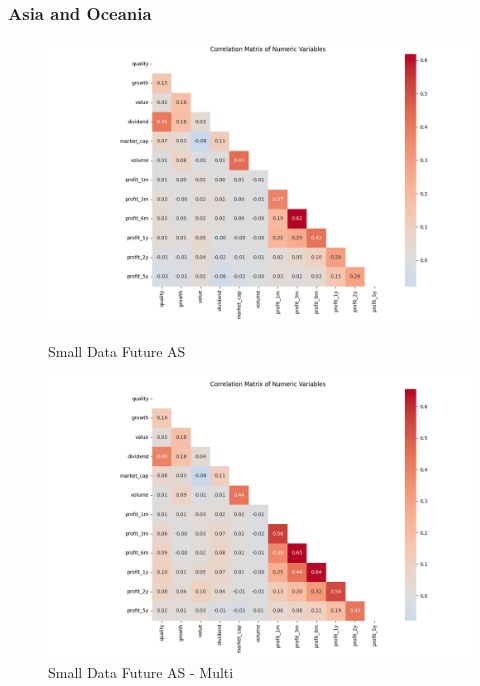 \documentclass[11pt,english,a4paper,hidelinks]{book}
\begin{document}
\subsubsection{Asia and Oceania}
\begin{figure}[H]
    \centering
    \begin{minipage}{0.48\textwidth}
        \centering
        \includegraphics[width=\linewidth]{images/code/descriptive analysis/correlations/Small Data future AS.png}
        \caption{Small Data Future AS}
        \label{fig:small_data_future_as_correlations}
    \end{minipage}
    \begin{minipage}{0.48\textwidth}
        \centering
        \includegraphics[width=\linewidth]{images/code/descriptive analysis/correlations/Small Data future AS - Multi.png}
        \caption{Small Data Future AS - Multi}
        \label{fig:small_data_future_as_multi_correlations}
    \end{minipage}
\end{figure}
\end{document}
